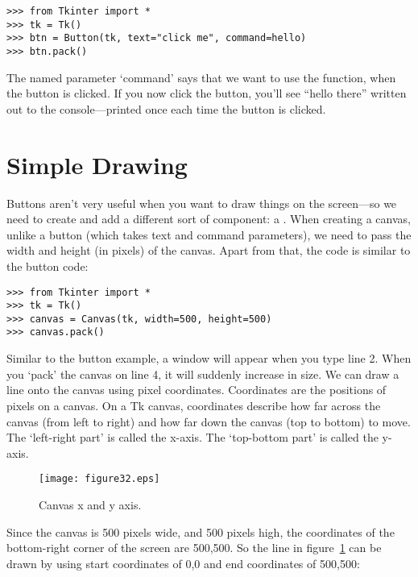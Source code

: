 \begin{listing}
\begin{verbatim}
>>> from Tkinter import *
>>> tk = Tk()
>>> btn = Button(tk, text="click me", command=hello)
>>> btn.pack()
\end{verbatim}
\end{listing}

The named parameter `command' says that we want to use the  function, when the button is clicked. If you now click the button, you'll see ``hello there'' written out to the console---printed once each time the button is clicked.

\section{Simple Drawing}

Buttons aren't very useful when you want to draw things on the screen---so we need to create and add a different sort of component: a . When creating a canvas, unlike a button (which takes text and command parameters), we need to pass the width and height (in pixels) of the canvas. Apart from that, the code is similar to the button code:

\begin{listing}
\begin{verbatim}
>>> from Tkinter import *
>>> tk = Tk()
>>> canvas = Canvas(tk, width=500, height=500)
>>> canvas.pack()
\end{verbatim}
\end{listing}

Similar to the button example, a window will appear when you type line 2.  When you `pack' the canvas on line 4, it will suddenly increase in size. We can draw a line onto the canvas using pixel coordinates. Coordinates are the positions of pixels on a canvas. On a Tk canvas, coordinates describe how far across the canvas (from left to right) and how far down the canvas (top to bottom) to move.  The `left-right part' is called the x-axis.  The `top-bottom part' is called the y-axis.

\begin{figure}
\begin{center}
\texttt{[image: figure32.eps]}
\end{center}
\caption{Canvas x and y axis.}\label{fig32}
\end{figure}

Since the canvas is 500 pixels wide, and 500 pixels high, the coordinates of the bottom-right corner of the screen are 500,500. So the line in figure~\ref{fig32} can be drawn by using start coordinates of 0,0 and end coordinates of 500,500:


